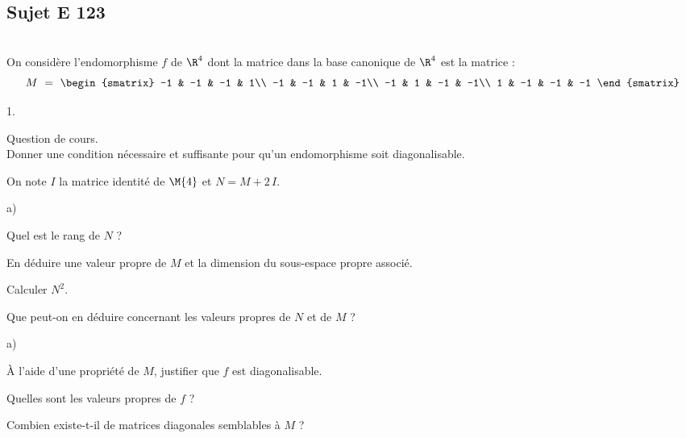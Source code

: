 \documentclass[11pt]{article}%
\begin{document}
\newpage


\subsection*{Sujet E 123}

\begin{exerciceAP}~\\
  On considère l'endomorphisme $f$ de $\R^4$ dont la matrice dans la
  base canonique de $\R^4$ est la matrice :
  \[
    M \ = \
    \begin{smatrix}
      -1 & -1 & -1 & 1\\
      -1 & -1 & 1 & -1\\
      -1 & 1 & -1 & -1\\
      1 & -1 & -1 & -1
    \end{smatrix}
  \]
  \begin{noliste}{1.}
    \setlength{\itemsep}{2mm}
  \item Question de cours.\\
    Donner une condition nécessaire et suffisante pour qu'un
    endomorphisme soit diagonalisable.
    
  \item On note $I$ la matrice identité de $\M{4}$ et $N=M+2 \, I$.
    \begin{noliste}{a)}
      \setlength{\itemsep}{2mm}
    \item Quel est le rang de $N$ ?
      
    \item En déduire une valeur propre de $M$ et la dimension du
      sous-espace propre associé.
      
    \item Calculer $N^2$.
      
    \item Que peut-on en déduire concernant les valeurs propres de $N$
      et de $M$ ?
    \end{noliste}
    
  \item
    \begin{noliste}{a)}
      \setlength{\itemsep}{2mm}
    \item À l'aide d'une propriété de $M$, justifier que $f$ est
      diagonalisable.
      
    \item Quelles sont les valeurs propres de $f$ ?
      
    \item Combien existe-t-il de matrices diagonales semblables à $M$
      ?
      

\end{noliste}
\end{noliste}
\end{exerciceAP}
\end{document}
